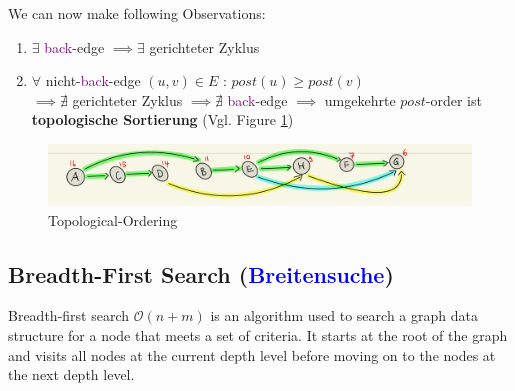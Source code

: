 \documentclass[a4paper]{article}
\begin{document}
We can now make following Observations: 
\begin{enumerate}
    \item $\exists$ \textcolor{purple}{back}-edge $\implies \exists$ gerichteter Zyklus
    \item $\forall$ nicht-\textcolor{purple}{back}-edge $(u,v) \in E$ : $post(u) \geq post(v)$ \\
    $\implies \nexists$ gerichteter Zyklus $\implies \nexists$  \textcolor{purple}{back}-edge $\implies$ umgekehrte $post$-order ist \textbf{topologische Sortierung} (Vgl. Figure \ref{fig:topOrdering})
\end{enumerate}
\begin{figure}[h]
    \centering
    \includegraphics[scale = 0.35]{Pictures/Topologicalordering.png}
    \caption{Topological-Ordering}
    \label{fig:topOrdering}
\end{figure}

\newpage 
\subsection{Breadth-First Search (\textcolor{blue}{Breitensuche})}
    Breadth-first search $\mathcal{O}(n+m)$ is an algorithm used to search a graph data structure for a node that meets a set of criteria. It starts at the root of the graph and visits all nodes at the current depth level before moving on to the nodes at the next depth level.
\end{document}
